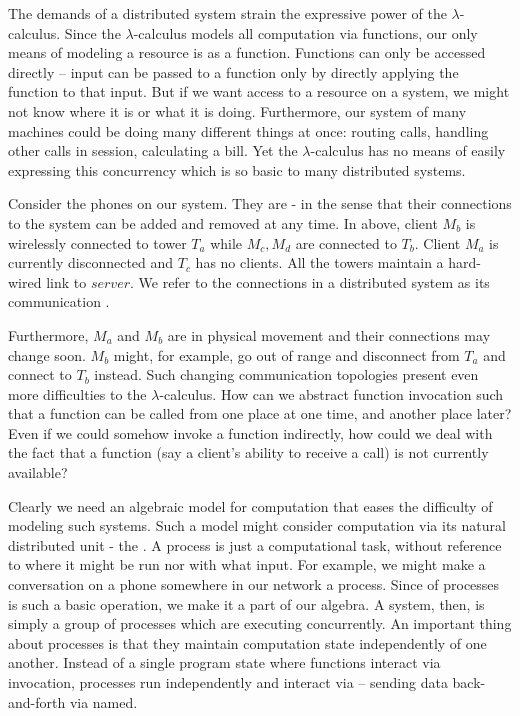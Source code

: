 The demands of a distributed system strain the expressive power of the $\lambda$-calculus.  
Since the $\lambda$-calculus models all computation via functions, our only means of modeling a resource is as a function.  
Functions can only be accessed directly -- input can be passed to a function only by directly applying the function to that input.  
But if we want access to a resource on a system, we might not know where it is or what it is doing.  
Furthermore, our system of many machines could be doing many different things at once: routing calls, handling other calls in session, calculating a bill.  
Yet the $\lambda$-calculus has no means of easily expressing this concurrency which is so basic to many distributed systems.


Consider the phones on our system.  
They are - in the sense that their connections to the system can be added and removed at any time.  
In  above, client $M_b$ is wirelessly connected to tower $T_a$ while $M_c,M_d$ are connected to $T_b$.  
Client $M_a$ is currently disconnected and $T_c$ has no clients.  
All the towers maintain a hard-wired link to $server$.  
We refer to the connections in a distributed system as its communication .

Furthermore, $M_a$ and $M_b$ are in physical movement and their connections may change soon.  
$M_b$ might, for example, go out of range and disconnect from $T_a$ and connect to $T_b$ instead.  
Such changing communication topologies present even more difficulties to the $\lambda$-calculus.  
How can we abstract function invocation such that a function can be called from one place at one time, and another place later?  Even if we could somehow invoke a function indirectly, how could we deal with the fact that a function (say a client's ability to receive a call) is not currently available?

Clearly we need an algebraic model for computation that eases the difficulty of modeling such systems.  
Such a model might consider computation via its natural distributed unit - the .  
A process is just a computational task, without reference to where it might be run nor with what input.  
For example, we might make a conversation on a phone somewhere in our network a process. 
Since  of processes is such a basic operation, we make it a part of our algebra.  
A system, then, is simply a group of processes which are executing concurrently. 
An important thing about processes is that they maintain computation state independently of one another.  
Instead of a single program state where functions interact via invocation, processes run independently and interact via  -- sending data back-and-forth via named.  


